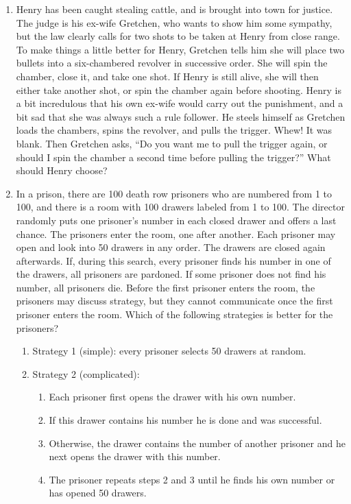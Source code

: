\documentclass[12pt]{article}
\begin{document}
\begin{enumerate}[1.]
\item Henry has been caught stealing cattle, and is brought into town for
  justice. The judge is his ex-wife Gretchen, who wants to show him some
  sympathy, but the law clearly calls for two shots to be taken at Henry from
  close range. To make things a little better for Henry, Gretchen tells him she
  will place two bullets into a six-chambered revolver in successive order. She
  will spin the chamber, close it, and take one shot. If Henry is still alive,
  she will then either take another shot, or spin the chamber again before
  shooting. Henry is a bit incredulous that his own ex-wife would carry out the
  punishment, and a bit sad that she was always such a rule follower. He steels
  himself as Gretchen loads the chambers, spins the revolver, and pulls the
  trigger. Whew! It was blank. Then Gretchen asks, ``Do you want me to pull the
  trigger again, or should I spin the chamber a second time before pulling the
  trigger?'' What should Henry choose?
  
\item In a prison, there are 100 death row prisoners who are numbered from 1 to
  100, and there is a room with 100 drawers labeled from 1 to 100. The director
  randomly puts one prisoner's number in each closed drawer and offers a last
  chance. The prisoners enter the room, one after another. Each prisoner may
  open and look into 50 drawers in any order. The drawers are closed again
  afterwards. If, during this search, every prisoner finds his number in one of
  the drawers, all prisoners are pardoned. If some prisoner does not find his
  number, all prisoners die. Before the first prisoner enters the room, the
  prisoners may discuss strategy, but they cannot communicate once the first
  prisoner enters the room.
  Which of the following strategies is better for the prisoners? 
  \begin{enumerate}
  \item Strategy 1 (simple): every prisoner selects 50 drawers at random.
  \item Strategy 2 (complicated): 
    \begin{enumerate}
    \item Each prisoner first opens the drawer with his own number.
    \item If this drawer contains his number he is done and was
      successful.
    \item Otherwise, the drawer contains the number of another prisoner
      and he next opens the drawer with this number.
    \item The prisoner repeats steps 2 and 3 until he finds his own number
      or has opened 50 drawers.
    \end{enumerate}
  \end{enumerate}
  

\end{enumerate}
\end{document}

